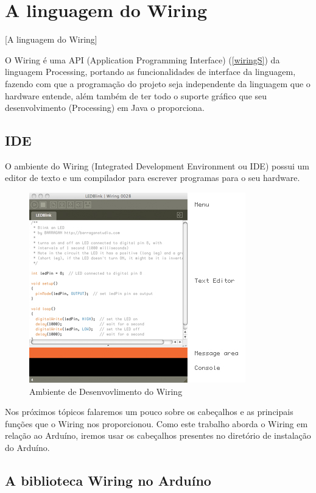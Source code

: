 \section{A linguagem do Wiring}[A linguagem do Wiring]

O Wiring é uma API (Application Programming Interface) (\autoref{wiringS}) da linguagem Processing, portando as funcionalidades de interface da linguagem, fazendo com que a programação do projeto seja independente da linguagem que o hardware entende, além também de ter todo o suporte gráfico que seu desenvolvimento (Processing) em Java o proporciona. 

\subsection{IDE}

O ambiente do Wiring (Integrated Development Environment ou IDE) possui um editor de texto e um compilador para escrever programas para o seu hardware. 

\begin{figure}[htb]
	\caption{\label{wiringIDE}Ambiente de Desenvovlimento do Wiring}
	\begin{center}
	    \includegraphics[scale=0.9]{artigo/refs/ide.jpeg}
	\end{center}
\end{figure}

Nos próximos tópicos falaremos um pouco sobre os cabeçalhos e as principais funções que o Wiring nos proporcionou. Como este trabalho aborda o Wiring em relação ao Arduíno, iremos usar os cabeçalhos presentes no diretório de instalação do Arduíno.

\subsection{A biblioteca Wiring no Arduíno}

